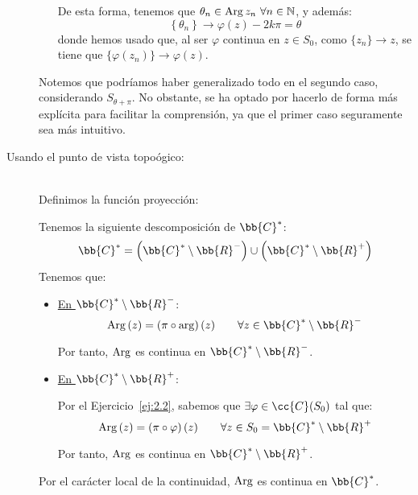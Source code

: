 \begin{ejercicio}
\begin{description}
\begin{itemize}
            De esta forma, tenemos que $\theta_n\in \operatorname{Arg} z_n~\forall n\in \mathbb{N}$, y además:
            \begin{equation*}
                \left\{\theta_n\right\} \to \varphi(z)-2k\pi = \theta
            \end{equation*}
            donde hemos usado que, al ser $\varphi$ continua en $z\in S_0$, como $\{z_n\}\to z$, se tiene que $\{\varphi(z_n)\}\to \varphi(z)$.
        \end{itemize}
        \begin{observacion}
            Notemos que podríamos haber generalizado todo en el segundo caso, considerando $S_{\theta+\pi}$. No obstante, se ha optado por hacerlo de forma más explícita para facilitar la comprensión, ya que el primer caso seguramente sea más intuitivo.
        \end{observacion}
        
        \item[Usando el punto de vista topoógico:]~\\
        
        Definimos la función proyección:

        Tenemos la siguiente descomposición de $\bb{C}^*$:
        \begin{equation*}
            \bb{C}^* = \left(\bb{C}^*\setminus \bb{R}^-\right)\cup \left(\bb{C}^*\setminus \bb{R}^+\right)
        \end{equation*}
        Tenemos que:
        \begin{itemize}
            \item \ul{En $\bb{C}^*\setminus \bb{R}^-$}:
            \begin{equation*}
                \Arg\left(z\right)=\left(\pi\circ \arg\right)(z)\qquad \forall z\in \bb{C}^*\setminus \bb{R}^-
            \end{equation*}

            Por tanto, $\operatorname{Arg}$ es continua en $\bb{C}^*\setminus \bb{R}^-$.

            \item \ul{En $\bb{C}^*\setminus \bb{R}^+$}:
            
            Por el Ejercicio~\ref{ej:2.2}, sabemos que $\exists \varphi\in \cc{C}(S_{0})$ tal que:
            \begin{equation*}
                \Arg\left(z\right)=\left(\pi\circ \varphi\right)(z)\qquad \forall z\in S_0=\bb{C}^*\setminus \bb{R}^+
            \end{equation*}

            Por tanto, $\operatorname{Arg}$ es continua en $\bb{C}^*\setminus \bb{R}^+$.
        \end{itemize}

        Por el carácter local de la continuidad, $\operatorname{Arg}$ es continua en $\bb{C}^*$.
    \end{description}
\end{ejercicio}


